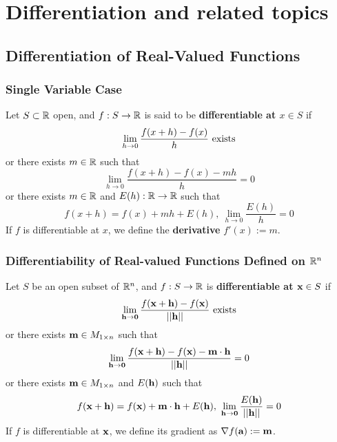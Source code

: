 \documentclass[11pt]{article}
\newcommand{\vex}[0]{\ve{x}}
\newcommand{\vea}[0]{\ve{a}}
\begin{document}
	\section{Differentiation and related topics}
		\subsection{Differentiation of Real-Valued Functions}
			\subsubsection{Single Variable Case}
				\begin{definition}
					Let $S \subset \mathbb{R}$ open, and $f: S \to \mathbb{R}$ is said to be \textbf{differentiable at $x \in S$} if 
					\begin{equation}
						\lim_{h \to 0} \frac{f(x+h) - f(x)}{h} \text{{ exists}}
					\end{equation}
					or there exists $m \in \mathbb{R}$ such that
					\begin{equation}
						\lim_{h \to 0} \frac{f(x+h) - f(x) - mh}{h} = 0
					\end{equation}
					or there exists $m \in \mathbb{R}$ and $E(h): \mathbb{R} \to \mathbb{R}$ such that
					\begin{equation}
						f(x+h) = f(x) + mh + E(h),\ \lim_{h \to 0} \frac{E(h)}{h} = 0
					\end{equation}
					If $f$ is differentiable at $x$, we define the \textbf{derivative} $f'(x) := m$.
				\end{definition}
			
			\subsubsection{Differentiability of Real-valued Functions Defined on $\mathbb{R}^n$}
				\begin{definition}
					Let $S$ be an open subset of $\mathbb{R}^n$, and $f: S \to \mathbb{R}$ is \textbf{differentiable at $\vex \in S$} if 
					\begin{equation}
						\lim_{\ve{h} \to \ve{0}} \frac{
							f(\vex + \ve{h}) - f(\vex)
						}{\norm{\ve{h}}} \tx{ exists}
					\end{equation}
					or there exists $\textbf{m} \in M_{1\times n}$ such that
					\begin{equation}
						\lim_{\ve{h} \to \ve{0}} \frac{
							f(\vex + \ve{h}) - f(\vex) - \ve{m} \cdot \ve{h}
						}{\norm{\ve{h}}} = 0
					\end{equation}
					or there exists $\textbf{m} \in M_{1\times n}$ and $E(\textbf{h})$ such that
					\begin{equation}
						f(\vex + \ve{h}) = f(\vex) + \ve{m} \cdot \ve{h} + E(\ve{h}),\ \lim_{\ve{h} \to \ve{0}} \frac{E(\ve{h})}{\norm{\ve{h}}} = 0
					\end{equation}
					If $f$ is differentiable at $\vex$, we define its gradient as $\nabla f(\vea) := \ve{m}$.
				\end{definition}
\end{document}
